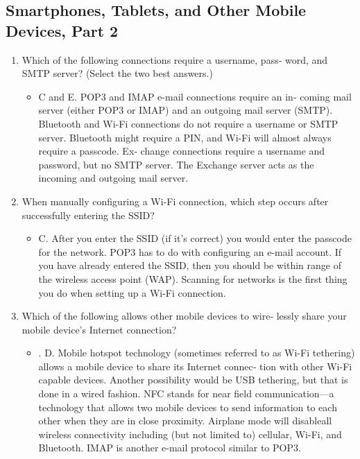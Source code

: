 \documentclass{article}
\begin{document}
\subsection{Smartphones, Tablets, and Other Mobile Devices, Part 2}
\begin{enumerate}
    \item Which of the following connections require a username, pass‐
word, and SMTP server? (Select the two best answers.)
    \begin{itemize}
        \item C and E. POP3 and IMAP e-mail connections require an in‐
coming mail server (either POP3 or IMAP) and an outgoing
mail server (SMTP). Bluetooth and Wi-Fi connections do not
require a username or SMTP server. Bluetooth might require a
PIN, and Wi-Fi will almost always require a passcode. Ex‐
change connections require a username and password, but no
SMTP server. The Exchange server acts as the incoming and
outgoing mail server.
    \end{itemize}
    \item When manually configuring a Wi-Fi connection, which step
occurs after successfully entering the SSID?
    \begin{itemize}
        \item C. After you enter the SSID (if it’s correct) you would enter
the passcode for the network. POP3 has to do with configuring
an e-mail account. If you have already entered the SSID, then
you should be within range of the wireless access point
(WAP). Scanning for networks is the first thing you do when
setting up a Wi-Fi connection.
    \end{itemize}
    \item Which of the following allows other mobile devices to wire‐
lessly share your mobile device’s Internet connection?
    \begin{itemize}
        \item . D. Mobile hotspot technology (sometimes referred to as Wi-Fi
tethering) allows a mobile device to share its Internet connec‐
tion with other Wi-Fi capable devices. Another possibility
would be USB tethering, but that is done in a wired fashion.
NFC stands for near field communication—a technology that
allows two mobile devices to send information to each other
when they are in close proximity. Airplane mode will disableall wireless connectivity including (but not limited to) cellular,
Wi-Fi, and Bluetooth. IMAP is another e-mail protocol similar
to POP3.
    \end{itemize}

\end{enumerate}
\end{document}
